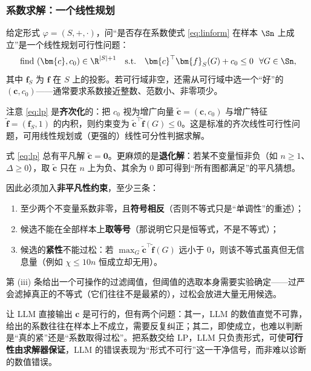 \subsubsection{系数求解：一个线性规划}

给定形式 $\varphi=(S,+,\cdot)$，问“是否存在系数使式 \eqref{eq:linform} 在样本 $\Sn$ 上成立”是一个线性规划可行性问题：
\begin{equation}
  \text{find } (\bm{c},c_0)\in\R^{|S|+1} \quad\text{s.t.}\quad
  \bm{c}^{\top}\bm{f}_{S}(G) + c_0 \le 0 \ \ \forall G\in\Sn,
  \label{eq:lp}
\end{equation}
其中 $\bm{f}_S$ 为 $\bm{f}$ 在 $S$ 上的投影。若可行域非空，还需从可行域中选一个“好”的 $(\bm{c},c_0)$——通常要求系数接近整数、范数小、非零项少。

注意 \eqref{eq:lp} 是\textbf{齐次化}的：把 $c_0$ 视为增广向量 $\tilde{\bm{c}}=(\bm{c},c_0)$ 与增广特征 $\tilde{\bm{f}}=(\bm{f}_S,1)$ 的内积，则约束变为 $\tilde{\bm{c}}^\top\tilde{\bm{f}}(G)\le0$。这是标准的齐次线性可行性问题，可用线性规划或（更强的）线性可分性判据求解。

\begin{remark}[平凡解的排除]
\label{rem:trivial}
式 \eqref{eq:lp} 总有平凡解 $\tilde{\bm{c}}=\bm{0}$。更麻烦的是\textbf{退化解}：若某不变量恒非负（如 $n\ge 1$、$\Delta\ge 0$），取 $\tilde{\bm{c}}$ 只在 $n$ 上为负、其余为 $0$ 即可得到“所有图都满足”的平凡猜想。

因此必须加入\textbf{非平凡性约束}，至少三条：
\begin{enumerate}[label=(\roman*)]
  \item 至少两个不变量系数非零，且\textbf{符号相反}（否则不等式只是“单调性”的重述）；
  \item 候选不能在全部样本上\textbf{取等号}（那说明它只是恒等式，不是不等式）；
  \item 候选的\textbf{紧性}不能过松：若 $\max_G \tilde{\bm{c}}^\top\tilde{\bm{f}}(G)$ 远小于 $0$，则该不等式虽真但无信息量（例如 $\chi\le 10n$ 恒成立却无用）。
\end{enumerate}
第 (iii) 条给出一个可操作的过滤阈值，但阈值的选取本身需要实验确定——过严会滤掉真正的不等式（它们往往不是最紧的），过松会放进大量无用候选。
\end{remark}

\begin{remark}
\label{rem:llm-coef}
让 LLM 直接输出 $\bm{c}$ 是可行的，但有两个问题：其一，LLM 的数值直觉不可靠，给出的系数往往在样本上不成立，需要反复纠正；其二，即使成立，也难以判断是“真的紧”还是“系数取得过松”。把系数交给 LP，LLM 只负责形式，可使\textbf{可行性由求解器保证}，LLM 的错误表现为“形式不可行”这一干净信号，而非难以诊断的数值错误。
\end{remark}

